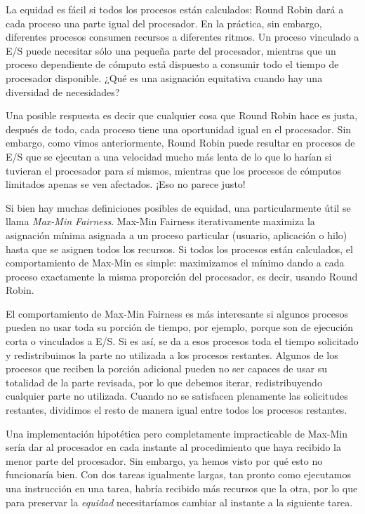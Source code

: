 \documentclass[10pt]{book}
\begin{document}
La equidad es fácil si todos los procesos están calculados: Round Robin dará a cada proceso una parte igual del procesador. En la práctica, sin embargo, diferentes procesos consumen recursos a diferentes ritmos. Un proceso vinculado a E/S puede necesitar sólo una pequeña parte del procesador, mientras que un proceso dependiente de cómputo está dispuesto a consumir todo el tiempo de procesador disponible. ¿Qué es una asignación equitativa cuando hay una diversidad de necesidades?

Una posible respuesta es decir que cualquier cosa que Round Robin hace es justa, después de todo, cada proceso tiene una oportunidad igual en el procesador. Sin embargo, como vimos anteriormente, Round Robin puede resultar en procesos de E/S que se ejecutan a una velocidad mucho más lenta de lo que lo harían si tuvieran el procesador para sí mismos, mientras que los procesos de cómputos limitados apenas se ven afectados. ¡Eso no parece justo!

Si bien hay muchas definiciones posibles de equidad, una particularmente útil se llama \textit{Max-Min Fairness}. Max-Min Fairness iterativamente maximiza la asignación mínima asignada a un proceso particular (usuario, aplicación o hilo) hasta que se asignen todos los recursos. Si todos los procesos están calculados, el comportamiento de Max-Min es simple: maximizamos el mínimo dando a cada proceso exactamente la misma proporción del procesador, es decir, usando Round Robin.

El comportamiento de Max-Min Fairness es más interesante si algunos procesos pueden no usar toda su porción de tiempo, por ejemplo, porque son de ejecución corta o vinculados a E/S. Si es así, se da a esos procesos toda el tiempo solicitado y redistribuimos la parte no utilizada a los procesos restantes. Algunos de los procesos que reciben la porción adicional pueden no ser capaces de usar su totalidad de la parte revisada, por lo que debemos iterar, redistribuyendo cualquier parte no utilizada. Cuando no se satisfacen plenamente las solicitudes restantes, dividimos el resto de manera igual entre todos los procesos restantes.

Una implementación hipotética pero completamente impracticable de Max-Min sería dar al procesador en cada instante al procedimiento que haya recibido la menor parte del procesador. Sin embargo, ya hemos visto por qué esto no funcionaría bien. Con dos tareas igualmente largas, tan pronto como ejecutamos una instrucción en una tarea, habría recibido más recursos que la otra, por lo que para preservar la \textit{equidad} necesitaríamos cambiar al instante a la siguiente tarea.
\end{document}
